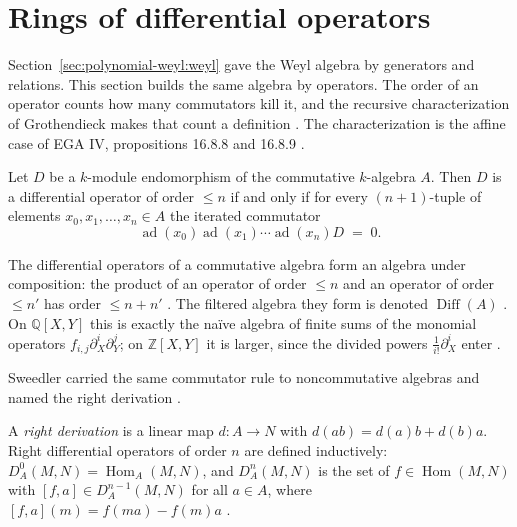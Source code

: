 \section{Rings of differential operators}\label{sec:polynomial-weyl:differential-operators}

Section~\ref{sec:polynomial-weyl:weyl} gave the Weyl algebra by
generators and relations. This section builds the same algebra by
operators. The order of an operator counts how many commutators kill it,
and the recursive characterization of Grothendieck makes that count a
definition \cite[Theorem~6.2, p.~4]{Hazewinkel2013}. The characterization
is the affine case of EGA IV, propositions 16.8.8 and 16.8.9
\cite[p.~5]{Hazewinkel2013}.

\begin{theorem}
\label{thm:pw:diffop-order}
Let $D$ be a $k$-module endomorphism of the commutative $k$-algebra $A$.
Then $D$ is a differential operator of order $\leq n$ if and only if for
every $(n+1)$-tuple of elements $x_{0},x_{1},\dots,x_{n}\in A$ the
iterated commutator
\[
\operatorname{ad}(x_{0})\operatorname{ad}(x_{1})\cdots
\operatorname{ad}(x_{n})D \;=\; 0 .
\]
\end{theorem}

The differential operators of a commutative algebra form an algebra under
composition: the product of an operator of order $\leq n$ and an operator
of order $\leq n'$ has order $\leq n+n'$
\cite[6.4, p.~5]{Hazewinkel2013}. The filtered algebra they form is
denoted $\operatorname{Diff}(A)$ \cite[6.4, p.~5]{Hazewinkel2013}. On
$\mathbb{Q}[X,Y]$ this is exactly the na\"ive algebra of finite sums of
the monomial operators $f_{i,j}\partial_{X}^{i}\partial_{Y}^{j}$; on
$\mathbb{Z}[X,Y]$ it is larger, since the divided powers
$\frac{1}{i!}\partial_{X}^{i}$ enter \cite[6.4, p.~5]{Hazewinkel2013}.

Sweedler carried the same commutator rule to noncommutative algebras and
named the right derivation \cite[p.~29]{Sweedler1980}.

\begin{remark}\label{rem:pw:sweedler-right}
A \emph{right derivation} is a linear map $d\colon A\to N$ with
$d(ab)=d(a)b+d(b)a$. Right differential operators of order $n$ are defined
inductively: $D^{0}_{A}(M,N)=\operatorname{Hom}_{A}(M,N)$, and
$D^{n}_{A}(M,N)$ is the set of $f\in\operatorname{Hom}(M,N)$ with
$[f,a]\in D^{n-1}_{A}(M,N)$ for all $a\in A$, where
$[f,a](m)=f(ma)-f(m)a$ \cite[p.~29]{Sweedler1980}.
\end{remark}

